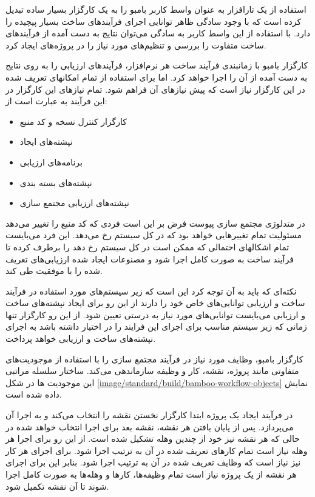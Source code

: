 استفاده از یک تارافزار به عنوان واسط کاربر بامبو را به یک کارگزار بسیار ساده
تبدیل کرده است که با وجود سادگی ظاهر توانایی اجرای فرآیندهای ساخت بسیار پیچیده
را دارد. با استفاده از این واسط کاربر به سادگی می‌توان نتایج به دست آمده از
فرآیندهای ساخت متفاوت را بررسی و تنظیم‌های مورد نیاز را در پروژه‌های ایجاد کرد.
 
کارگزار بامبو با زمانبندی فرآیند ساخت هر نرم‌افزار، فرآیندهای ارزیابی را به روی
نتایج به دست آمده از آن را اجرا خواهد کرد. اما برای استفاده از تمام امکانهای
تعریف شده در این کارگزار نیاز است که پیش نیازهای آن فراهم شود. تمام نیازهای این
کارگزار در این فرآیند به عبارت است از:

\begin{itemize}
  \item کارگزار کنترل نسخه و کد منبع
  \item نپشته‌های ایجاد
  \item برنامه‌های ارزیابی
  \item نپشته‌های بسته بندی
  \item نپشته‌های ارزیابی مجتمع سازی
\end{itemize}

در متدلوژی مجتمع سازی پیوست فرض بر این است فردی که کد منبع را تغییر می‌دهد
مسئولیت تمام تغییرهایی خواهد بود که در کل سیستم رخ می‌دهد. این فرد می‌بایست تمام
اشکالهای احتمالی که ممکن است در کل سیستم رخ دهد را برطرف کرده تا فرآیند ساخت به
صورت کامل اجرا شود و مصنوعات ایجاد شده ارزیابی‌های تعریف شده را با موفقیت طی
کند.

نکته‌ای که باید به آن توجه کرد این است که زیر سیستم‌های مورد استفاده در فرآیند
ساخت و ارزیابی توانایی‌های خاص خود را دارند از این رو برای ایجاد نپشته‌های ساخت
و ارزیابی می‌بایست توانایی‌های مورد نیاز به درستی تعیین شود. از این رو کارگزار
تنها زمانی که زیر سیستم مناسب برای اجرای این فرایند را در اختیار داشته باشد به
اجرای نپشته‌های ساخت و ارزیابی خواهد پرداخت.


کارگزار بامبو، وظایف مورد نیاز در فرآیند مجتمع سازی را با استفاده از موجودیت‌های
متفاوتی مانند پروژه، نقشه، کار و وظیفه سازماندهی می‌کند. ساختار سلسله مراتبی این
موجودیت ها در شکل \ref{image/standard/build/bamboo-workflow-objects} نمایش داده
شده است.

در فرآیند ایجاد یک پروژه ابتدا کارگزار نخستن نقشه را انتخاب می‌کند و به اجرا آن
می‌پردازد. پس از پایان یافتن هر نقشه، نقشه بعد برای اجرا انتخاب خواهد شده در
حالی که هر نقشه نیز خود از چندین وهله تشکیل شده است. از این رو برای اجرا هر وهله
نیاز است تمام کارهای تعریف شده در آن به ترتیب اجرا شود. برای اجرای هر کار نیز
نیاز است که وظایف تعریف شده در آن به ترتیب اجرا شود. بنابر این برای اجرای هر
نقشه از یک پروژه نیاز است تمام وظیفه‌ها، کارها و وهله‌ها به صورت کامل اجرا شوند
تا آن نقشه تکمیل شود.


